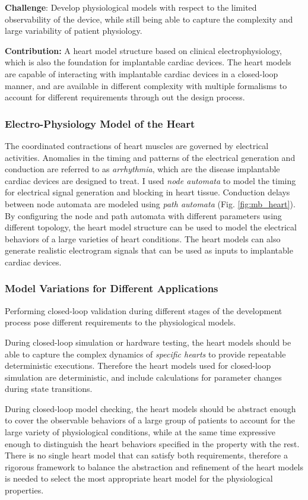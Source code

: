 \documentclass[a4paper,11pt]{article}
\begin{document}
\noindent \textbf{Challenge}: Develop physiological models with respect to the limited observability of the device, while still being able to capture the complexity and large variability of patient physiology.

\noindent \textbf{Contribution:} A heart model structure based on clinical electrophysiology, which is also the foundation for implantable cardiac devices.
The heart models are capable of interacting with implantable cardiac devices in a closed-loop manner, and are available in different complexity with multiple formalisms to account for different requirements through out the design process.
\subsubsection{Electro-Physiology Model of the Heart}
The coordinated contractions of heart muscles are governed by electrical activities.
Anomalies in the timing and patterns of the electrical generation and conduction are referred to as \emph{arrhythmia}, which are the disease implantable cardiac devices are designed to treat.
I used \emph{node automata} to model the timing for electrical signal generation and blocking in heart tissue.
Conduction delays between node automata are modeled using \emph{path automata} (Fig. \ref{fig:mb_heart}).
By configuring the node and path automata with different parameters using different topology, the heart model structure can be used to model the electrical behaviors of a large varieties of heart conditions. 
The heart models can also generate realistic electrogram signals that can be used as inputs to implantable cardiac devices.

\subsubsection{Model Variations for Different Applications}
Performing closed-loop validation during different stages of the development process pose different requirements to the physiological models.

During closed-loop simulation or hardware testing, the heart models should be able to capture the complex dynamics of \emph{specific hearts} to provide repeatable deterministic executions.
Therefore the heart models used for closed-loop simulation are deterministic, and include calculations for parameter changes during state transitions.

During closed-loop model checking, the heart models should be abstract enough to cover the observable behaviors of a large group of patients to account for the large variety of physiological conditions, while at the same time expressive enough to distinguish the heart behaviors specified in the property with the rest.
There is no single heart model that can satisfy both requirements, therefore a rigorous framework to balance the abstraction and refinement of the heart models is needed to select the most appropriate heart model for the physiological properties.
\end{document}
